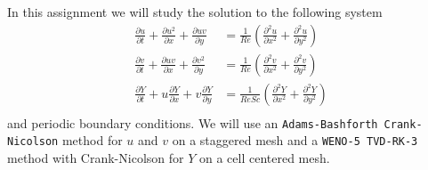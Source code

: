 In this assignment we will study the solution to the following system
\begin{align*}
\frac{\partial u}{\partial t}+\frac{\partial u^2}{\partial x}+\frac{\partial uv}{\partial y} &= \frac{1}{Re}\left(\frac{\partial^2 u}{\partial x^2}+\frac{\partial^2 u}{\partial y^2}\right)\\
\frac{\partial v}{\partial t}+\frac{\partial uv}{\partial x}+\frac{\partial v^2}{\partial y} &= \frac{1}{Re}\left(\frac{\partial^2 v}{\partial x^2}+\frac{\partial^2 v}{\partial y^2}\right)\\
\frac{\partial Y}{\partial t}+u\frac{\partial Y}{\partial x}+v\frac{\partial Y}{\partial y} &= \frac{1}{ReSc}\left(\frac{\partial^2 Y}{\partial x^2}+\frac{\partial^2 Y}{\partial y^2}\right)\\
\end{align*}
and periodic boundary conditions. We will use an \texttt{Adams-Bashforth Crank-Nicolson} method for $u$ and $v$ on a staggered mesh and a \texttt{WENO-5 TVD-RK-3} method with Crank-Nicolson for $Y$ on a cell centered mesh.